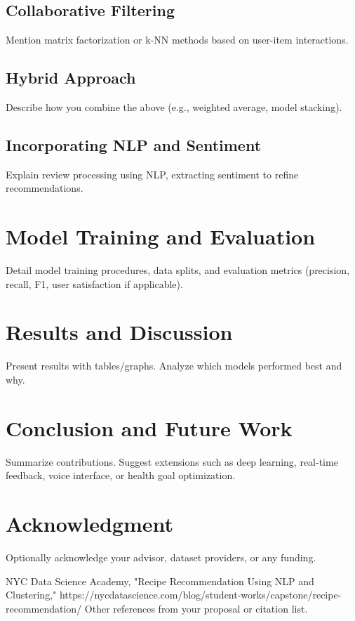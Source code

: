 \documentclass[conference]{IEEEtran}
\begin{document}
\subsection{Collaborative Filtering}
Mention matrix factorization or k-NN methods based on user-item interactions.

\subsection{Hybrid Approach}
Describe how you combine the above (e.g., weighted average, model stacking).

\subsection{Incorporating NLP and Sentiment}
Explain review processing using NLP, extracting sentiment to refine recommendations.

\section{Model Training and Evaluation}
Detail model training procedures, data splits, and evaluation metrics (precision, recall, F1, user satisfaction if applicable).

\section{Results and Discussion}
Present results with tables/graphs. Analyze which models performed best and why.

\section{Conclusion and Future Work}
Summarize contributions. Suggest extensions such as deep learning, real-time feedback, voice interface, or health goal optimization.

\section*{Acknowledgment}
Optionally acknowledge your advisor, dataset providers, or any funding.

\begin{thebibliography}{00}
 NYC Data Science Academy, "Recipe Recommendation Using NLP and Clustering," https://nycdatascience.com/blog/student-works/capstone/recipe-recommendation/
 Other references from your proposal or citation list.
\end{thebibliography}
\end{document}
